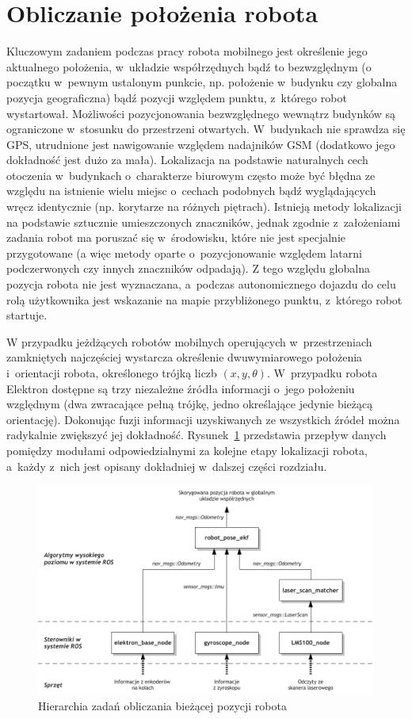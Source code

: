 \section{Obliczanie położenia robota}

Kluczowym zadaniem podczas pracy robota mobilnego jest określenie jego
aktualnego położenia, w~układzie współrzędnych bądź to bezwzględnym (o początku
w~pewnym ustalonym punkcie, np. położenie w~budynku czy globalna pozycja
geograficzna) bądź pozycji względem punktu, z~którego robot wystartował.
Możliwości pozycjonowania bezwzględnego wewnątrz budynków są ograniczone 
w~stosunku do przestrzeni otwartych. W~budynkach nie sprawdza się GPS, utrudnione
jest nawigowanie względem nadajników GSM (dodatkowo jego dokładność jest dużo
za mała). Lokalizacja na podstawie naturalnych cech otoczenia w~budynkach 
o~charakterze biurowym często może być błędna ze względu na istnienie wielu miejsc
o~cechach podobnych bądź wyglądających wręcz identycznie (np. korytarze na
różnych piętrach). Istnieją metody lokalizacji na podstawie sztucznie
umieszczonych znaczników, jednak zgodnie z~założeniami zadania robot ma poruszać
się w~środowisku, które nie jest specjalnie przygotowane (a więc metody oparte 
o~pozycjonowanie względem latarni podczerwonych czy innych znaczników odpadają).
Z tego względu globalna pozycja robota nie jest wyznaczana, a~podczas
autonomicznego dojazdu do celu rolą użytkownika jest wskazanie na mapie
przybliżonego punktu, z~którego robot startuje.

W przypadku jeżdżących robotów mobilnych operujących w~przestrzeniach
zamkniętych najczęściej wystarcza określenie dwuwymiarowego położenia 
i~orientacji robota, określonego trójką liczb $(x, y, \theta)$. W~przypadku
robota Elektron dostępne są trzy niezależne źródła informacji o~jego położeniu
względnym (dwa zwracające pełną trójkę, jedno określające jedynie bieżącą
orientację). Dokonując fuzji informacji uzyskiwanych ze wszystkich źródeł można
radykalnie zwiększyć jej dokładność. Rysunek~\ref{fig:diag_pos} przedstawia
przepływ danych pomiędzy modułami odpowiedzialnymi za kolejne etapy lokalizacji
robota, a~każdy z~nich jest opisany dokładniej w~dalszej części rozdziału.

\begin{figure}[h!]
\centering
\includegraphics{../img/diag_position}
\caption{Hierarchia zadań obliczania bieżącej pozycji robota}
\label{fig:diag_pos}
\end{figure}

